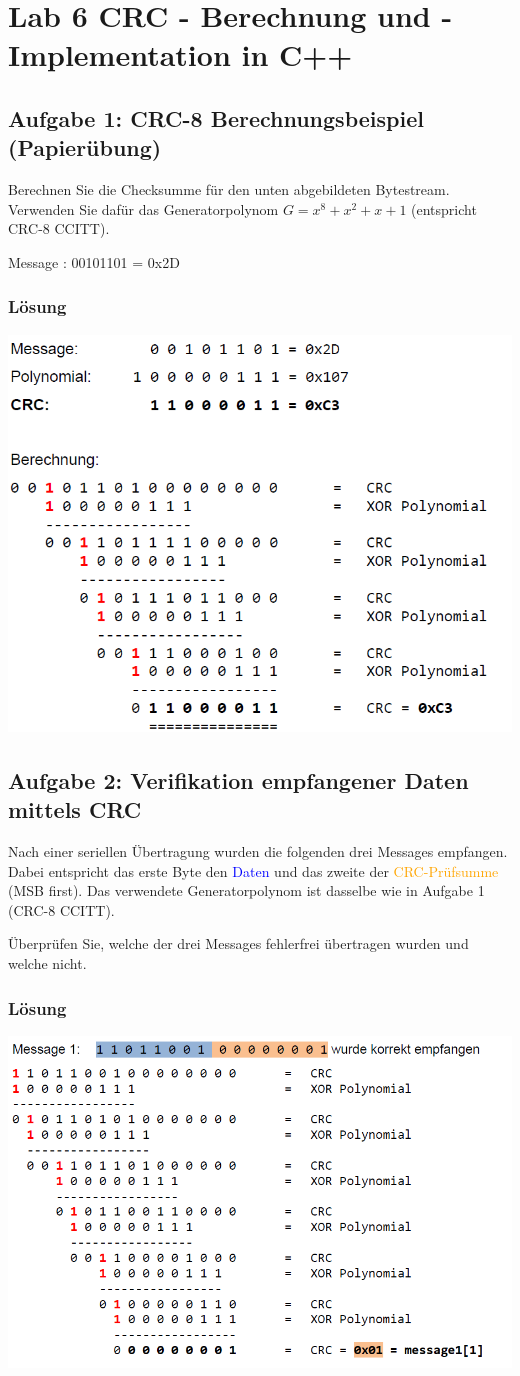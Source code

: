 \section{Lab 6 CRC - Berechnung und -Implementation in C++}
\subsection{Aufgabe 1: CRC-8 Berechnungsbeispiel (Papierübung)}
Berechnen Sie die Checksumme für den unten abgebildeten Bytestream. Verwenden Sie dafür das Generatorpolynom
$G = x^8 + x^2 + x + 1$ (entspricht CRC-8 CCITT).

Message : 00101101 = 0x2D

\subsubsection{Lösung}
\begin{center}
  \includegraphics[width=.5\linewidth]{900-Praktika/prak06/crc1.PNG}
\end{center}

\subsection{Aufgabe 2: Verifikation empfangener Daten mittels CRC}

Nach einer seriellen Übertragung wurden die folgenden drei Messages empfangen. Dabei entspricht das erste Byte den \textcolor{blue}{Daten} und das zweite der \textcolor{orange}{CRC-Prüfsumme} (MSB first). Das verwendete Generatorpolynom ist dasselbe wie in Aufgabe 1 (CRC-8 CCITT).

Überprüfen Sie, welche der drei Messages fehlerfrei übertragen wurden und welche nicht.

\subsubsection{Lösung}
\begin{center}
  \includegraphics[width=.6\linewidth]{900-Praktika/prak06/crc2.PNG}
\end{center}

